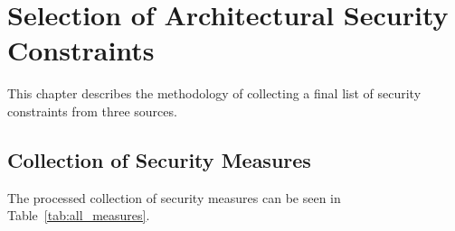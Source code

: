\chapter{Selection of Architectural Security Constraints}

This chapter describes the methodology of collecting a final list of security constraints from three sources. 

\section{Collection of Security Measures}

The processed collection of security measures can be seen in Table~\ref{tab:all_measures}.


